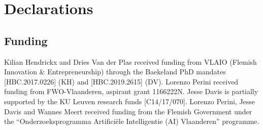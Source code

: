 \documentclass[natbib,smallcondensed]{svjour3}
\begin{document}
\begin{abstract}
Machine learning models always make a prediction, even when it is likely to be inaccurate. This behavior should be avoided in many decision support applications, where mistakes can have severe consequences. Albeit already studied in 1970, machine learning with rejection recently gained interest. This machine learning subfield enables machine learning models to abstain from making a prediction when likely to make a mistake.

This survey aims to provide an overview on machine learning with rejection. We introduce the conditions leading to two types of rejection, ambiguity and novelty rejection, which we carefully formalize. Moreover, we review and categorize strategies to evaluate a model's predictive and rejective quality. Additionally, we define the existing architectures for models with rejection and describe the standard techniques for learning such models. Finally, we provide examples of relevant application domains and show how machine learning with rejection relates to other machine learning research areas. 


\end{abstract}

\tableofcontents
\newpage












\section*{Declarations}

\subsection*{Funding}
Kilian Hendrickx and Dries Van der Plas received funding from VLAIO (Flemish Innovation \& Entrepreneurship) through the Baekeland PhD mandates [HBC.2017.0226] (KH) and [HBC.2019.2615] (DV). 
Lorenzo Perini received funding from FWO-Vlaanderen, aspirant grant 1166222N.
Jesse Davis is partially supported by the KU Leuven research funds [C14/17/070]. 
Lorenzo Perini, Jesse Davis and Wannes Meert received funding from the Flemish Government under the ``Onderzoeksprogramma Artifici\"{e}le Intelligentie (AI) Vlaanderen'' programme.
\end{document}

